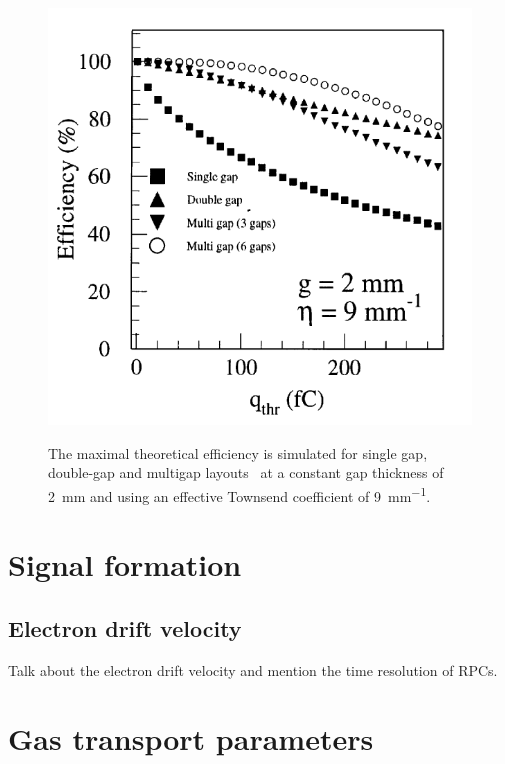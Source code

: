 	\begin{figure}[H]
		\centering
		\includegraphics[width = 0.6\plotwidth]{fig/chapt4/Layout_eff_vs_thr.png}\\
		\caption{\label{fig:EffThreshold} The maximal theoretical efficiency is simulated for single gap, double-gap and multigap layouts~\cite{ABBRESCIA99} at a constant gap thickness of \SI{2}{mm} and using an effective Townsend coefficient of \SI{9}{mm^{-1}}.}
	\end{figure}

\section{Signal formation}
\label{chapt4:sec:signal}
	
	\subsection{Electron drift velocity}
	\label{chapt4:ssec:drift}
	
	{\color{blue} Talk about the electron drift velocity and mention the time resolution of RPCs.}

\section{Gas transport parameters}
\label{chapt4:sec:transport}



\clearpage{\pagestyle{empty}\cleardoublepage}
